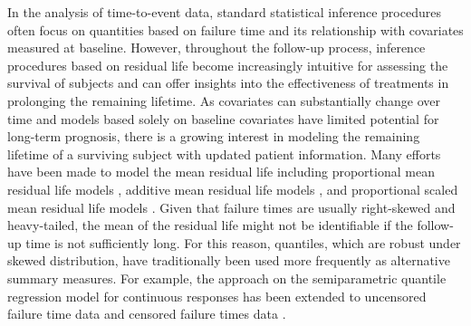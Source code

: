 In the analysis of time-to-event data, standard statistical inference procedures often focus on quantities 
based on failure time and its relationship with covariates measured at baseline. 
However, throughout the follow-up process,
inference procedures based on residual life become increasingly intuitive for assessing the survival of subjects 
and can offer insights into the effectiveness of treatments in prolonging the remaining lifetime. 
As covariates can substantially change over time and
models based solely on baseline covariates have limited potential for long-term prognosis, 
there is a growing interest in modeling the remaining lifetime of a surviving subject with updated patient information. 
Many efforts have been made to model the mean residual life including proportional mean residual life models 
\citep{maguluri1994estimation, oakes1990note, oakes2003inference, chen2005semiparametric}, 
additive mean residual life models \citep{chen2006linear, chen2007additive, zhang2010goodness}, 
and proportional scaled mean residual life models \citep{liu2008regression}. 
Given that failure times are usually right-skewed and heavy-tailed, 
the mean of the residual life might not be identifiable if 
the follow-up time is not sufficiently long. 
For this reason, quantiles, which are robust under skewed distribution, 
have traditionally been used more frequently as alternative summary measures.
For example, the approach on the semiparametric quantile regression model for continuous responses \citep{koenker1978regression} has been extended to uncensored failure time data 
\citep{jung1996quasi, portnoy1997gaussian, wei2006quantile} 
and censored failure times data \citep{ying1995survival, portnoy2003censored,peng2008survival, huang2010quantile}. 


